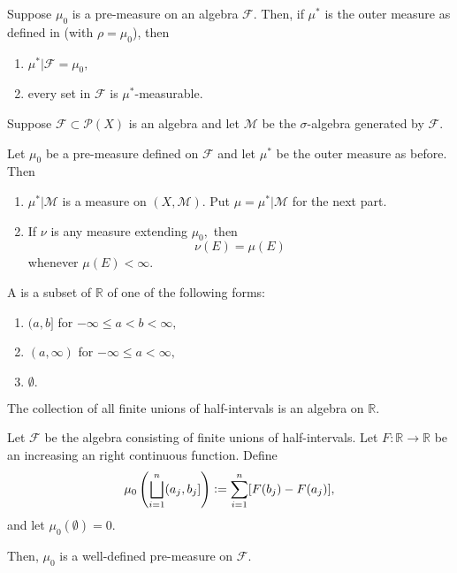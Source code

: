 \documentclass[12pt]{article}	%
\begin{document}
\begin{prop}
	Suppose $\mu_0$ is a pre-measure on an algebra $\mathcal{F}.$ Then, if $\mu^*$ is the outer measure as defined in  (with $\rho = \mu_0$), then
	\begin{enumerate}
		\item $\mu^*|\mathcal{F} = \mu_0,$
		\item every set in $\mathcal{F}$ is $\mu^*$-measurable.
	\end{enumerate}
\end{prop}

\begin{thm}
	Suppose $\mathcal{F} \subset \mathcal{P}(X)$ is an algebra and let $\mathcal{M}$ be the $\sigma$-algebra generated by $\mathcal{F}.$

	Let $\mu_0$ be a pre-measure defined on $\mathcal{F}$ and let $\mu^*$ be the outer measure as before. Then
	\begin{enumerate}
		\item $\mu^*|\mathcal{M}$ is a measure on $(X, \mathcal{M}).$ Put $\mu = \mu^*|\mathcal{M}$ for the next part.
		\item If $\nu$ is any measure extending $\mu_0,$ then
		\begin{equation*} 
			\nu(E) = \mu(E)
		\end{equation*}
		whenever $\mu(E) < \infty.$
	\end{enumerate}
\end{thm}

\begin{defn}
	A  is a subset of $\mathbb{R}$ of one of the following forms:
	\begin{enumerate}
		\item $(a, b]$ for $-\infty \le a < b < \infty,$ 
		\item $(a, \infty)$ for $-\infty \le a < \infty,$
		\item $\emptyset.$
	\end{enumerate}
\end{defn}

\begin{prop}
	The collection of all finite unions of half-intervals is an algebra on $\mathbb{R}.$
\end{prop}

\begin{prop} 
	Let $\mathcal{F}$ be the algebra consisting of finite unions of half-intervals. Let $F : \mathbb{R} \to \mathbb{R}$ be an increasing an right continuous function. Define
	\begin{equation*} 
		\mu_0\left(\bigsqcup_{i = 1}^n (a_j, b_j]\right) \vcentcolon= \sum_{i = 1}^{n} [F(b_j) - F(a_j)],
	\end{equation*}
	and let $\mu_0(\emptyset) = 0.$
	
	Then, $\mu_0$ is a well-defined pre-measure on $\mathcal{F}.$
\end{prop}
\end{document}
